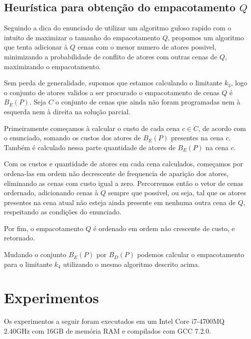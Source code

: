 \documentclass[a4paper,11pt]{article}
\begin{document}
\subsection{Heurística para obtenção do empacotamento $Q$}
Seguindo a dica do enunciado de utilizar um algoritmo guloso rapido com o intuito
de maximizar o tamanho do empacotamento $Q$, propomos um algoritmo que tenta
adicionar à $Q$ cenas com o menor numero de atores possivel, minimizando a probabilidade
de conflito de atores com outras cenas de $Q$, maximizando o empacotamento.

Sem perda de generalidade, supomos que estamos calculando o
limitante $k_3$, logo o conjunto de atores validos a ser procurado o empacotamento
de cenas $Q$ é $B_E(P)$. Seja $C$ o conjunto de cenas que ainda não foram programadas nem à esquerda nem
à direita na solução parcial.

Primeiramente começamos à calcular o custo de cada cena $c \in C$, de acordo com
o enunciado, somando os custos dos atores de $B_E(P)$ presentes na cena $c$. Também
é calculado nessa parte quantidade de atores de $B_E(P)$ na cena $c$.

Com os custos e quantidade de atores em cada cena calculados, começamos por ordena-las
em ordem não decrescente de frequencia de aparição dos atores, eliminando
as cenas com custo igual a zero. Percorremos então o vetor de cenas ordernado,
adicionando cenas à $Q$ sempre que possivel, ou seja, tal que os atores presentes
na cena atual não esteja ainda presente em nenhuma outra cena de $Q$, respeitando as condições
do enunciado.

Por fim, o empacotamento $Q$ é ordenado em ordem não crescente de custo, e retornado.

Mudando o conjunto $B_E(P)$ por $B_D(P)$ podemos calcular o empacotamento para o
limitante $k_4$ utilizando o mesmo algoritmo descrito acima.

\section{Experimentos}
Os experimentos a seguir foram executados em um Intel Core i7-4700MQ 2.40GHz com
16GB de memória RAM e compilados com GCC 7.2.0.
\end{document}
